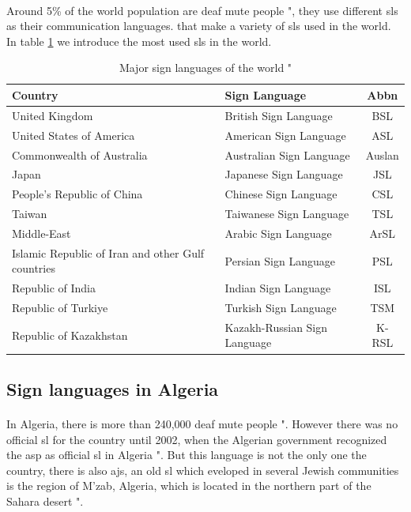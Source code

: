\paragraph{}
Around 5\% of the world population are deaf mute people "\cite{5perc}, they use different \ac{sl}s as their communication languages. that make a variety of \ac{sl}s used in the world. In table \ref{tab:major-sign-languages-of-the-world} we introduce the most used \ac{sl}s in the world.
\begin{table}[h]
	\caption{Major sign languages of the world "\cite{state_of_the_art}}
	\label{tab:major-sign-languages-of-the-world}
	\begin{tabular}{|l|l|c|}
		\hline
		\textbf{Country}  & \textbf{Sign Language} & \textbf{Abbn} \\
		\hline
		United Kingdom & British Sign Language & BSL \\
		\hline
		United States of America & American Sign Language & ASL \\
		\hline
		Commonwealth of Australia & Australian Sign Language & Auslan \\
		\hline
		Japan & Japanese Sign Language & JSL \\
		\hline
		People's Republic of China & Chinese Sign Language & CSL \\
		\hline
		Taiwan & Taiwanese Sign Language & TSL \\
		\hline
		Middle-East & Arabic Sign Language & ArSL \\
		\hline
		Islamic Republic of Iran and other Gulf countries & Persian Sign Language & PSL \\
		\hline
		Republic of India & Indian Sign Language & ISL \\
		\hline
		Republic of Turkiye & Turkish Sign Language & TSM \\
		\hline
		Republic of Kazakhstan & Kazakh-Russian Sign Language & K-RSL \\
		\hline
	\end{tabular}
\end{table}
\subsection{Sign languages in Algeria}
\paragraph{}
In Algeria, there is more than 240,000 deaf mute people "\cite{ethnologue}. However there was no official \ac{sl} for the country until 2002, when the Algerian government  recognized the \ac{asp} as official \ac{sl} in Algeria "\cite{wiki}. But this language is not the only one the country, there is also \ac{ajs}, an old \ac{sl} which eveloped in several Jewish communities is the region of M'zab, Algeria, which is located in the northern part of the Sahara desert "\cite{sara}.
